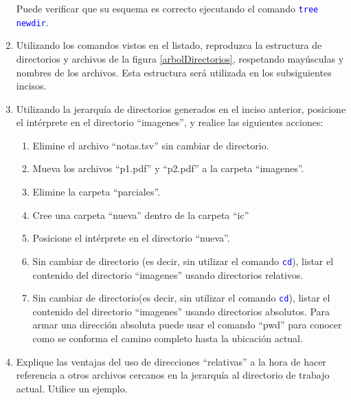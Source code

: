 \documentclass[12pt]{article}
\newcommand{\cw}[1]{\mbox{\texttt{\textcolor{blue}{#1}}}}
\begin{document}
\begin{enumerate}[resume]
        Puede verificar que su esquema es correcto ejecutando el comando
        \cw{tree newdir}.

    \item Utilizando los comandos vistos en el listado, reproduzca la
        estructura de directorios y archivos de la figura
        \ref{arbolDirectorios}, respetando mayúsculas y nombres de los
        archivos. Esta estructura será utilizada en los subsiguientes incisos.

    \item Utilizando la jerarquía de directorios generados en el inciso
        anterior, posicione el intérprete en el directorio ``imagenes'', y
        realice las siguientes acciones:

    \begin{enumerate}

        \item Elimine el archivo ``notas.tsv'' sin cambiar de directorio.

        \item Mueva los archivos ``p1.pdf'' y ``p2.pdf'' a la carpeta
            ``imagenes''.

        \item Elimine la carpeta ``parciales''.

        \item Cree una carpeta ``nueva'' dentro de la carpeta ``ic''

        \item Posicione el intérprete en el directorio ``nueva''.

        \item Sin cambiar de directorio (es decir, sin utilizar el comando
            \cw{cd}), listar el contenido del directorio ``imagenes'' usando
            directorios relativos.

        \item Sin cambiar de directorio(es decir, sin utilizar el comando
            \cw{cd}), listar el contenido del directorio ``imagenes'' usando
            directorios absolutos. Para armar una dirección absoluta puede
            usar el comando ``pwd'' para conocer como se conforma el camino
            completo hasta la ubicación actual.

    \end{enumerate}

    \item Explique las ventajas del uso de direcciones ``relativas'' a la
            hora de hacer referencia a otros archivos cercanos en la jerarquía
            al directorio de trabajo actual. Utilice un ejemplo.


\end{enumerate}
\end{document}
